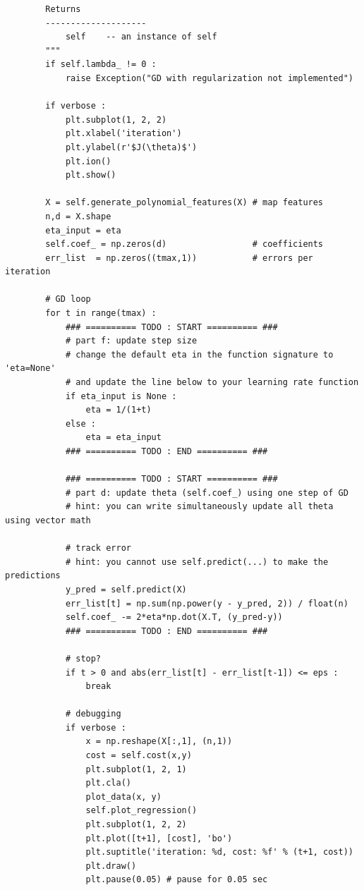 \documentclass[11pt]{article}
\begin{document}
\begin{verbatim}
        Returns
        --------------------
            self    -- an instance of self
        """
        if self.lambda_ != 0 :
            raise Exception("GD with regularization not implemented")
        
        if verbose :
            plt.subplot(1, 2, 2)
            plt.xlabel('iteration')
            plt.ylabel(r'$J(\theta)$')
            plt.ion()
            plt.show()
        
        X = self.generate_polynomial_features(X) # map features
        n,d = X.shape
        eta_input = eta
        self.coef_ = np.zeros(d)                 # coefficients
        err_list  = np.zeros((tmax,1))           # errors per iteration
        
        # GD loop
        for t in range(tmax) :
            ### ========== TODO : START ========== ###
            # part f: update step size
            # change the default eta in the function signature to 'eta=None'
            # and update the line below to your learning rate function
            if eta_input is None :
                eta = 1/(1+t)
            else :
                eta = eta_input
            ### ========== TODO : END ========== ###
                
            ### ========== TODO : START ========== ###
            # part d: update theta (self.coef_) using one step of GD
            # hint: you can write simultaneously update all theta using vector math
                
            # track error
            # hint: you cannot use self.predict(...) to make the predictions
            y_pred = self.predict(X)
            err_list[t] = np.sum(np.power(y - y_pred, 2)) / float(n)
            self.coef_ -= 2*eta*np.dot(X.T, (y_pred-y))
            ### ========== TODO : END ========== ###
            
            # stop?
            if t > 0 and abs(err_list[t] - err_list[t-1]) <= eps :
                break
            
            # debugging
            if verbose :
                x = np.reshape(X[:,1], (n,1))
                cost = self.cost(x,y)
                plt.subplot(1, 2, 1)
                plt.cla()
                plot_data(x, y)
                self.plot_regression()
                plt.subplot(1, 2, 2)
                plt.plot([t+1], [cost], 'bo')
                plt.suptitle('iteration: %d, cost: %f' % (t+1, cost))
                plt.draw()
                plt.pause(0.05) # pause for 0.05 sec
        

\end{verbatim}
\end{document}
